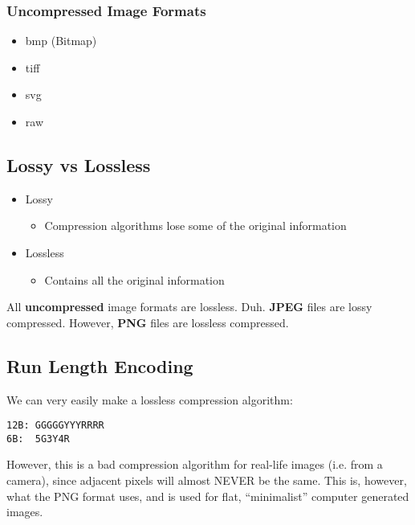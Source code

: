 \documentclass[11pt,fleqn]{article}
\theoremstyle{definition}
\begin{document}
\subsubsection{Uncompressed Image Formats}
\begin{itemize}
    \item bmp (Bitmap)
    \item tiff
    \item svg
    \item raw
\end{itemize}

\subsection{Lossy vs Lossless}
\begin{itemize}
    \item Lossy
        \begin{itemize}
            \item Compression algorithms lose some of the original information
        \end{itemize}
    \item Lossless
        \begin{itemize}
            \item Contains all the original information
        \end{itemize}
\end{itemize}

All \textbf{uncompressed} image formats are lossless. Duh. \textbf{JPEG} files are
lossy compressed. However, \textbf{PNG} files are lossless compressed.

\subsection{Run Length Encoding}
We can very easily make a lossless compression algorithm:
\begin{verbatim}
12B: GGGGGYYYRRRR
6B:  5G3Y4R
\end{verbatim}

However, this is a bad compression algorithm for real-life images (i.e. from a
camera), since adjacent pixels will almost NEVER be the same. This is, however, what
the PNG format uses, and is used for flat, ``minimalist'' computer generated images.
\end{document}
